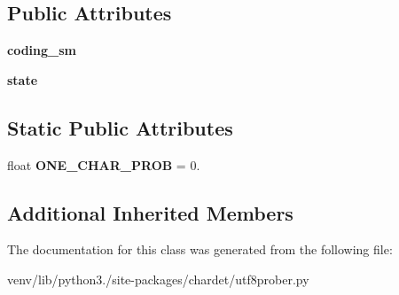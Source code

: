 \subsection*{Public Attributes}
\begin{DoxyCompactItemize}
\item 
\mbox{\label{classchardet_1_1utf8prober_1_1_u_t_f8_prober_ad179d489075370bf122838eec1287cbf}} 
{\bfseries coding\+\_\+sm}
\item 
\mbox{\label{classchardet_1_1utf8prober_1_1_u_t_f8_prober_aecc983362877de066138b27de615ecbd}} 
{\bfseries state}
\end{DoxyCompactItemize}
\subsection*{Static Public Attributes}
\begin{DoxyCompactItemize}
\item 
\mbox{\label{classchardet_1_1utf8prober_1_1_u_t_f8_prober_a6bf503953b4648990ac1b2ed642e4fcc}} 
float {\bfseries O\+N\+E\+\_\+\+C\+H\+A\+R\+\_\+\+P\+R\+OB} = 0.
\end{DoxyCompactItemize}
\subsection*{Additional Inherited Members}


The documentation for this class was generated from the following file\+:\begin{DoxyCompactItemize}
\item 
venv/lib/python3./site-\/packages/chardet/utf8prober.\+py\end{DoxyCompactItemize}
